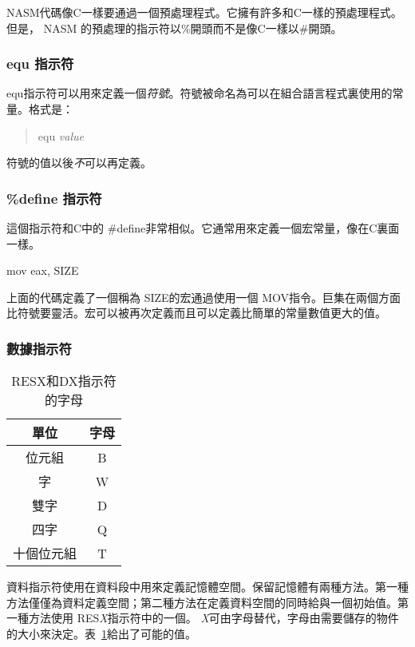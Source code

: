 NASM代碼像C一樣要通過一個預處理程式。它擁有許多和C一樣的預處理程式。但是，
NASM 的預處理的指示符以\%開頭而不是像C一樣以\#開頭。

\subsubsection{equ 指示符}

{\code
equ}指示符可以用來定義一個\emph{符號}。符號被命名為可以在組合語言程式裏使用的常量。格式是：
\begin{quote}
   equ {\em value}
\end{quote}
符號的值以後\emph{不}可以再定義。

\subsubsection{\%define 指示符}

這個指示符和C中的{\code
\#define}非常相似。它通常用來定義一個宏常量，像在C裏面一樣。
\begin{AsmCodeListing}[frame=none, numbers=none]
      mov    eax, SIZE
\end{AsmCodeListing}
上面的代碼定義了一個稱為 {\code SIZE}的宏通過使用一個{\code
MOV}指令。巨集在兩個方面比符號要靈活。宏可以被再次定義而且可以定義比簡單的常量數值更大的值。

\subsubsection{數據指示符}

\begin{table}[t]
\centering
\begin{tabular}{||c|c||} \hline
{\bf 單位} & {\bf 字母} \\
\hline
位元組 & B \\
字 & W \\
雙字 & D \\
四字 & Q \\
十個位元組 & T \\
\hline
\end{tabular}
\caption{{\code RESX}和{\code DX}指示符的字母
         \label{tab:size-letters} }
\end{table}

資料指示符使用在資料段中用來定義記憶體空間。保留記憶體有兩種方法。第一種方法僅僅為資料定義空間；第二種方法在定義資料空間的同時給與一個初始值。第一種方法使用{\code
RES{\em X}}指示符中的一個。{\em
X}可由字母替代，字母由需要儲存的物件的大小來決定。表~\ref{tab:size-letters}給出了可能的值。

